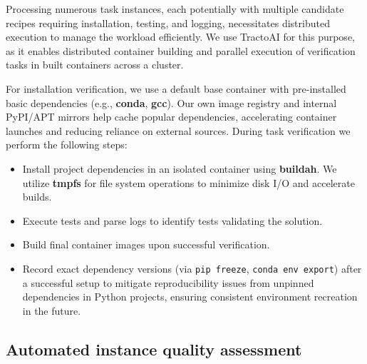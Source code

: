 \documentclass[dandb]{article}
\begin{document}
Processing numerous task instances, each potentially with multiple candidate recipes requiring installation, testing, and logging, necessitates distributed execution to manage the workload efficiently. We use TractoAI for this purpose, as it enables distributed container building and parallel execution of verification tasks in built containers across a cluster.

For installation verification, we use a default base container with pre-installed basic dependencies (e.g., \textbf{conda}, \textbf{gcc}). Our own image registry and internal PyPI/APT mirrors help cache popular dependencies, accelerating container launches and reducing reliance on external sources. During task verification we perform the following steps:

\begin{itemize}
    \item Install project dependencies in an isolated container using \textbf{buildah}. We utilize \textbf{tmpfs} for file system operations to minimize disk I/O and accelerate builds.
    \item Execute tests and parse logs to identify tests validating the solution.
    \item Build final container images upon successful verification.
    \item Record exact dependency versions (via \verb|pip freeze|, \verb|conda env export|) after a successful setup to mitigate reproducibility issues from unpinned dependencies in Python projects, ensuring consistent environment recreation in the future.
\end{itemize}

\subsection{Automated instance quality assessment}
\label{sec:automated_quality_assess}
\end{document}
